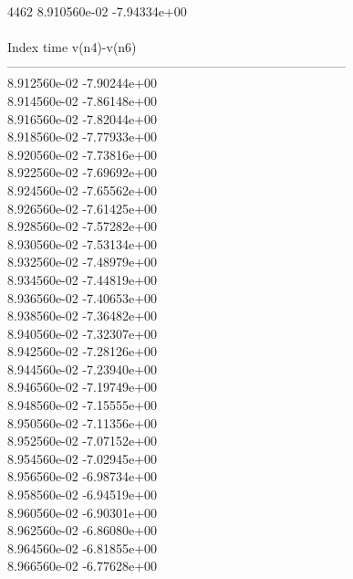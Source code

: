 4462	8.910560e-02	-7.94334e+00	\\ \hline
\\ \hline
Index   time            v(n4)-v(n6)     \\ \hline
--------------------------------------------------------------------------------\\ 	8.912560e-02	-7.90244e+00	\\ 	8.914560e-02	-7.86148e+00	\\ 	8.916560e-02	-7.82044e+00	\\ 	8.918560e-02	-7.77933e+00	\\ 	8.920560e-02	-7.73816e+00	\\ 	8.922560e-02	-7.69692e+00	\\ 	8.924560e-02	-7.65562e+00	\\ 	8.926560e-02	-7.61425e+00	\\ 	8.928560e-02	-7.57282e+00	\\ 	8.930560e-02	-7.53134e+00	\\ 	8.932560e-02	-7.48979e+00	\\ 	8.934560e-02	-7.44819e+00	\\ 	8.936560e-02	-7.40653e+00	\\ 	8.938560e-02	-7.36482e+00	\\ 	8.940560e-02	-7.32307e+00	\\ 	8.942560e-02	-7.28126e+00	\\ 	8.944560e-02	-7.23940e+00	\\ 	8.946560e-02	-7.19749e+00	\\ 	8.948560e-02	-7.15555e+00	\\ 	8.950560e-02	-7.11356e+00	\\ 	8.952560e-02	-7.07152e+00	\\ 	8.954560e-02	-7.02945e+00	\\ 	8.956560e-02	-6.98734e+00	\\ 	8.958560e-02	-6.94519e+00	\\ 	8.960560e-02	-6.90301e+00	\\ 	8.962560e-02	-6.86080e+00	\\ 	8.964560e-02	-6.81855e+00	\\ 	8.966560e-02	-6.77628e+00	\\ \hline
